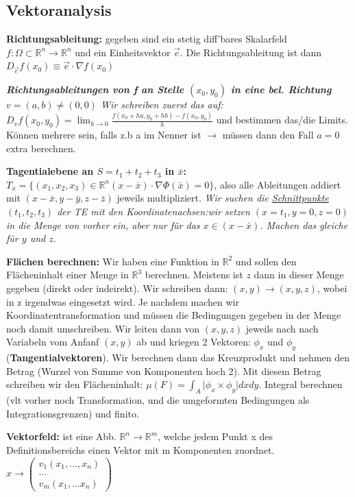 \documentclass[a3paper, ngerman, 8pt]{article}
\begin{document}
\begin{multicols*}{3}
\subsection*{Vektoranalysis}
\textbf{Richtungsableitung:} gegeben sind ein stetig diff'bares Skalarfeld $ f: \Omega \subset \mathbb{R}^n \to \mathbb{R}^n$ und ein Einheitsvektor $\vec{e}$. Die Richtungsableitung ist dann $D_{\vec{e}}f(x_0)\equiv\vec{e} \cdot \nabla f(x_0)$

\textit{\textbf{Richtungsableitungen von f an Stelle $(x_0,y_0)$ in eine bel. Richtung $v=(a,b)\neq (0,0)$} Wir schreiben zuerst das auf: $D_vf(x_0, y_0)=\lim_{h \to 0}\frac{f(x_0+ha, y_0+hb)-f(x_0, y_0)}{h}$} und bestimmen das/die Limits. Können mehrere sein, falls z.b a im Nenner ist $\to$ müssen dann den Fall $a=0$ extra berechnen. 

\textbf{Tagentialebene an $S=t_1+t_2+t_3$  in $\bar{x}$:} $T_{\bar{x}} = \{(x_1, x_2, x_3)\in \mathbb{R}^n (x-\bar{x})\cdot \nabla \Phi(\bar{x})=0\}$, also alle Ableitungen addiert mit $ (x-\bar{x}, y-\bar{y}, z-\bar{z})$ jeweils multipliziert. \textit{Wir suchen die \underline{Schnittpunkte $(t_1, t_2, t_3)$} der TE mit den Koordinatenachsen:wir setzen $(x=t_1, y=0, z=0)$ in die Menge von vorher ein, aber nur für das $x\in(x-\bar{x})$. Machen das gleiche für $y$ und $z$. }

\textbf{Flächen berechnen:} Wir haben eine Funktion in $\mathbb{R}^2$ und sollen den Flächeninhalt einer Menge in $\mathbb{R}^3$ berechnen. Meistens ist $z$ dann in dieser Menge gegeben (direkt oder indeirekt). Wir schreiben dann: $(x,y) \to (x,y,z)$, wobei in z irgendwas eingesetzt wird. Je nachdem machen wir Koordinatentransformation und müssen die Bedingungen gegeben in der Menge noch damit umschreiben. Wir leiten dann von $(x,y,z)$ jeweils nach nach Variabeln vom Anfanf $(x,y)$ ab und kriegen 2 Vektoren: $\phi_x$ und $\phi_y$ (\textbf{Tangentialvektoren}). Wir berechnen dann das Kreuzprodukt und nehmen den Betrag (Wurzel von Summe von Komponenten hoch 2). Mit diesem Betrag schreiben wir den Flächeninhalt: $\mu (F)= \int_{A} \vert \phi_x \times \phi_y \vert dxdy$. Integral berechnen (vlt vorher noch Transformation, und die umgeformten Bedingungen als Integrationsgrenzen) und finito.

\textbf{Vektorfeld:} ist eine Abb. $\mathbb{R}^n \to \mathbb{R}^m$, welche jedem Punkt x des Definitionsbereichs einen Vektor mit m Komponenten zuordnet. $x \to \begin{pmatrix}
v_1(x_1, ..., x_n) \\
...\\
v_m(x_1, ... x_n)
\end{pmatrix}$


\end{multicols*}
\end{document}
